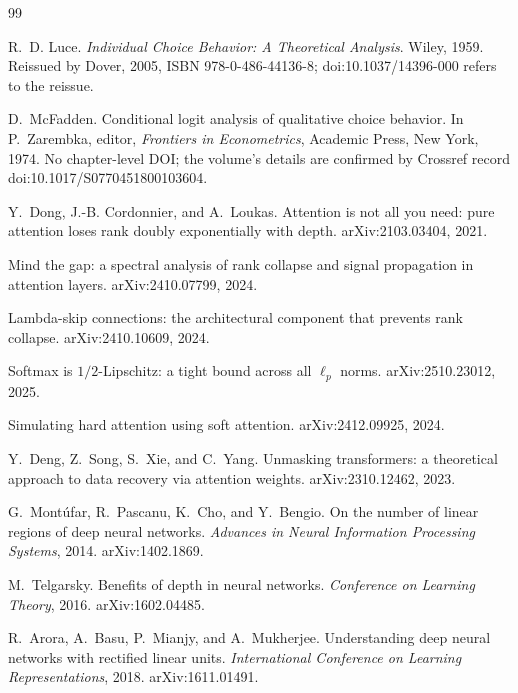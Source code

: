 \documentclass[11pt]{article}
\begin{document}
\begin{thebibliography}{99}

R.~D. Luce.
\newblock \emph{Individual Choice Behavior: A Theoretical Analysis}.
\newblock Wiley, 1959. Reissued by Dover, 2005, ISBN 978-0-486-44136-8;
  doi:10.1037/14396-000 refers to the reissue.

D.~McFadden.
\newblock Conditional logit analysis of qualitative choice behavior.
\newblock In P.~Zarembka, editor, \emph{Frontiers in Econometrics},
  Academic Press, New York, 1974. No chapter-level DOI; the volume's details
  are confirmed by Crossref record doi:10.1017/S0770451800103604.

Y.~Dong, J.-B. Cordonnier, and A.~Loukas.
\newblock Attention is not all you need: pure attention loses rank doubly
  exponentially with depth.
\newblock arXiv:2103.03404, 2021.

\newblock Mind the gap: a spectral analysis of rank collapse and signal
  propagation in attention layers.
\newblock arXiv:2410.07799, 2024.

\newblock Lambda-skip connections: the architectural component that prevents
  rank collapse.
\newblock arXiv:2410.10609, 2024.

\newblock Softmax is $1/2$-Lipschitz: a tight bound across all $\ell_p$ norms.
\newblock arXiv:2510.23012, 2025.

\newblock Simulating hard attention using soft attention.
\newblock arXiv:2412.09925, 2024.

Y.~Deng, Z.~Song, S.~Xie, and C.~Yang.
\newblock Unmasking transformers: a theoretical approach to data recovery via
  attention weights.
\newblock arXiv:2310.12462, 2023.

G.~Mont\'ufar, R.~Pascanu, K.~Cho, and Y.~Bengio.
\newblock On the number of linear regions of deep neural networks.
\newblock \emph{Advances in Neural Information Processing Systems}, 2014.
\newblock arXiv:1402.1869.

M.~Telgarsky.
\newblock Benefits of depth in neural networks.
\newblock \emph{Conference on Learning Theory}, 2016.
\newblock arXiv:1602.04485.

R.~Arora, A.~Basu, P.~Mianjy, and A.~Mukherjee.
\newblock Understanding deep neural networks with rectified linear units.
\newblock \emph{International Conference on Learning Representations}, 2018.
\newblock arXiv:1611.01491.


\end{thebibliography}
\end{document}
